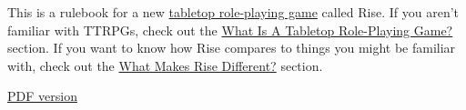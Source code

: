 \documentclass[oneside]{book} %
\begin{document}
This is a rulebook for a new \href{https://en.wikipedia.org/wiki/Tabletop_role-playing_game}{tabletop role-playing game} called Rise.
If you aren't familiar with TTRPGs, check out the \href{/rise/risese1.html}{What Is A Tabletop Role-Playing Game?} section.
If you want to know how Rise compares to things you might be familiar with, check out the \href{/rise/risese2.html}{What Makes Rise Different?} section.

\href{https://github.com/Vadskye/Rise/raw/master/core_book/Rise.pdf}{PDF version}
\tableofcontents






















\appendix
















\end{document}
